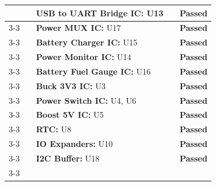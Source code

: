 \begin{longtable}{|c|p{}|p{}|p{}|c|}
                    & & \textbf{USB to UART Bridge IC:} U13 
                    & & \textcolor{modern_blue}{\textbf{Passed}} \\ \cline{3-3} \cline{5-5}
            
                    & & \textbf{Power MUX IC:} U17 
                    & & \textcolor{modern_blue}{\textbf{Passed}} \\ \cline{3-3} \cline{5-5}
            
                    & & \textbf{Battery Charger IC:} U15 
                    & & \textcolor{modern_blue}{\textbf{Passed}} \\ \cline{3-3} \cline{5-5}
            
                    & & \textbf{Power Monitor IC:} U14 
                    & & \textcolor{modern_blue}{\textbf{Passed}} \\ \cline{3-3} \cline{5-5}
            
                    & & \textbf{Battery Fuel Gauge IC:} U16 
                    & & \textcolor{modern_blue}{\textbf{Passed}} \\ \cline{3-3} \cline{5-5}
            
                    & & \textbf{Buck 3V3 IC:} U3 
                    & & \textcolor{modern_blue}{\textbf{Passed}} \\ \cline{3-3} \cline{5-5}
            
                    & & \textbf{Power Switch IC:} U4, U6 
                    & & \textcolor{modern_blue}{\textbf{Passed}} \\ \cline{3-3} \cline{5-5}
            
                    & & \textbf{Boost 5V IC:} U5 
                    & & \textcolor{modern_blue}{\textbf{Passed}} \\ \cline{3-3} \cline{5-5}
            
                    & & \textbf{RTC:} U8 
                    & & \textcolor{modern_blue}{\textbf{Passed}} \\ \cline{3-3} \cline{5-5}
            
                    & & \textbf{IO Expanders:} U10 
                    & & \textcolor{modern_blue}{\textbf{Passed}} \\ \cline{3-3} \cline{5-5}
            
                    & & \textbf{I2C Buffer:} U18 
                    & & \textcolor{modern_blue}{\textbf{Passed}} \\ \cline{3-3} \cline{5-5}
            

\end{longtable}

